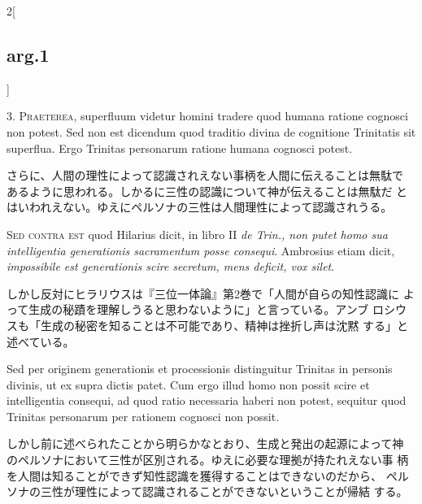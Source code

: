 \documentclass[paper=a4paper,fontsize=10pt,jafontsize=9pt,titlepage]{jlreq}
\begin{document}
\begin{paracol}{2}[\subsection{arg.1}]

3. {\scshape Praeterea}, superfluum videtur homini tradere quod humana ratione
cognosci non potest. Sed non est dicendum quod traditio divina de
cognitione Trinitatis sit superflua. Ergo Trinitas personarum ratione
humana cognosci potest.

\switchcolumn

さらに、人間の理性によって認識されえない事柄を人間に伝えることは無駄で
 あるように思われる。しかるに三性の認識について神が伝えることは無駄だ
 とはいわれえない。ゆえにペルソナの三性は人間理性によって認識されうる。

\switchcolumn*[\subsection{s.c.}]

{\scshape Sed contra est} quod Hilarius dicit, in libro II {\itshape de Trin., non putet
homo sua intelligentia generationis sacramentum posse
consequi}. Ambrosius etiam dicit, {\itshape impossibile est generationis scire
secretum, mens deficit, vox silet}.

\switchcolumn

しかし反対にヒラリウスは『三位一体論』第2巻で「人間が自らの知性認識に
 よって生成の秘蹟を理解しうると思わないように」と言っている。アンブ
 ロシウスも「生成の秘密を知ることは不可能であり、精神は挫折し声は沈黙
 する」と述べている。

\switchcolumn*

Sed per originem generationis et
processionis distinguitur Trinitas in personis divinis, ut ex supra
dictis patet. Cum ergo illud homo non possit scire et intelligentia
consequi, ad quod ratio necessaria haberi non potest, sequitur quod
Trinitas personarum per rationem cognosci non possit.

\switchcolumn

しかし前に述べられたことから明らかなとおり、生成と発出の起源によって神
 のペルソナにおいて三性が区別される。ゆえに必要な理拠が持たれえない事
 柄を人間は知ることができず知性認識を獲得することはできないのだから、
 ペルソナの三性が理性によって認識されることができないということが帰結
 する。



\end{paracol}
\end{document}
